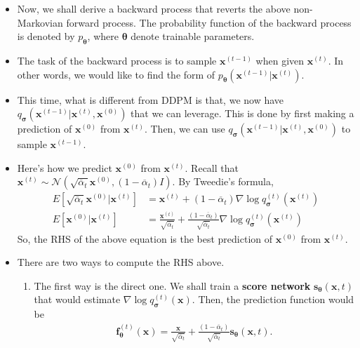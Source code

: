 \documentclass[10pt]{article}
\newcommand{\ve}[1]{\mathbf{#1}}
\newcommand{\ves}[1]{\boldsymbol{#1}}
\newcommand{\mcal}[1]{\mathcal{#1}}
\begin{document}
\begin{itemize}
  \item Now, we shall derive a backward process that reverts the above non-Markovian forward process. The probability function of the backward process is denoted by $p_{\ves{\theta}}$, where $\ves{\theta}$ denote trainable parameters.
  
  \item The task of the backward process is to sample $\ve{x}^{(t-1)}$ when given $\ve{x}^{(t)}$. In other words, we would like to find the form of $p_{\ves{\theta}}(\ve{x}^{(t-1)}|\ve{x}^{(t)})$.
  
  \item This time, what is different from DDPM is that, we now have $q_{\ves{\sigma}}(\ve{x}^{(t-1)}|\ve{x}^{(t)}, \ve{x}^{(0)})$ that we can leverage. This is done by first making a prediction of $\ve{x}^{(0)}$ from $\ve{x}^{(t)}$. Then, we can use $q_{\ves{\sigma}}(\ve{x}^{(t-1)}|\ve{x}^{(t)}, \ve{x}^{(0)})$ to sample $\ve{x}^{(t-1)}$.
  
  \item Here's how we predict $\ve{x}^{(0)}$ from $\ve{x}^{(t)}$. Recall that $\ve{x}^{(t)} \sim \mcal{N}( \sqrt{\overline{\alpha}_t} \ve{x}^{(0)}, (1 - \overline{\alpha}_t) I)$. By Tweedie's formula,
  \begin{align*}
    E[\sqrt{\overline{\alpha}_t} \ve{x}^{(0)}|\ve{x}^{(t)}] 
    &= \ve{x}^{(t)} + (1 - \overline{\alpha}_t) \nabla \log q_{\ves{\sigma}}^{(t)}(\ve{x}^{(t)}) \\
    E[\ve{x}^{(0)}|\ve{x}^{(t)}] 
    &= \frac{\ve{x}^{(t)}}{\sqrt{\overline{\alpha}_t}} + \frac{(1 - \overline{\alpha}_t)}{{\sqrt{\overline{\alpha}_t}} } \nabla \log q_{\ves{\sigma}}^{(t)}(\ve{x}^{(t)})
  \end{align*}
  So, the RHS of the above equation is the best prediction of $\ve{x}^{(0)}$ from $\ve{x}^{(t)}$. 

  \item There are two ways to compute the RHS above.
  \begin{enumerate}
    \item The first way is the direct one. We shall train a {\bf score network} $\ve{s}_{\ves{\theta}}(\ve{x}, t)$ that would estimate $\nabla \log q_{\ves{\sigma}}^{(t)}(\ve{x}).$ Then, the prediction function would be
    \begin{align*}
      \ve{f}^{(t)}_{\ves{\theta}}(\ve{x}) = \frac{\ve{x}}{\sqrt{\overline{\alpha}_t}} + \frac{(1 - \overline{\alpha}_t)}{{\sqrt{\overline{\alpha}_t}} } \ve{s}_{\ves{\theta}}(\ve{x}, t).
    \end{align*}


\end{enumerate}
\end{itemize}
\end{document}
